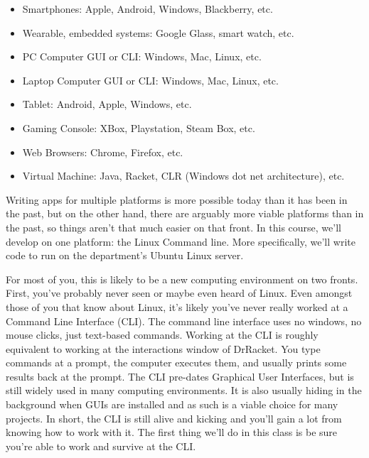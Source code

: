 \documentclass[nobib]{tufte-handout}
\begin{document}
\begin{itemize}
\item Smartphones: Apple, Android, Windows, Blackberry, etc.
\item Wearable, embedded systems: Google Glass, smart watch, etc.
\item PC Computer GUI or CLI\@: Windows, Mac, Linux, etc.
\item Laptop Computer GUI or CLI\@: Windows, Mac, Linux, etc.
\item Tablet: Android, Apple, Windows, etc.
\item Gaming Console: XBox, Playstation, Steam Box, etc.
\item Web Browsers: Chrome, Firefox, etc.
\item Virtual Machine: Java, Racket, CLR (Windows dot net architecture), etc.
\end{itemize}

Writing apps for multiple platforms is more possible today than it has been in the past, but on the other hand, there are arguably more viable platforms than in the past, so things aren't that much easier on that front.  In this course, we'll develop on one platform: the Linux Command line. More specifically, we'll write code to run on the department's Ubuntu Linux server.

For most of you, this is likely to be a new computing environment on two fronts.  First, you've probably never seen or maybe even heard of Linux.  Even amongst those of you that know about Linux, it's likely you've never really worked at a Command Line Interface (CLI).  The command line interface uses no windows, no mouse clicks, just text-based commands.  Working at the CLI is roughly equivalent to working at the interactions window of DrRacket. You type commands at a prompt, the computer executes them, and usually prints some results back at the prompt. The CLI pre-dates Graphical User Interfaces, but is still widely used in many computing environments.  It is also usually hiding in the background when GUIs are installed and as such is a viable choice for many projects. In short, the CLI is still alive and kicking and you'll gain a lot from knowing how to work with it.  The first thing we'll do in this class is be sure you're able to work and survive at the CLI.
\end{document}
